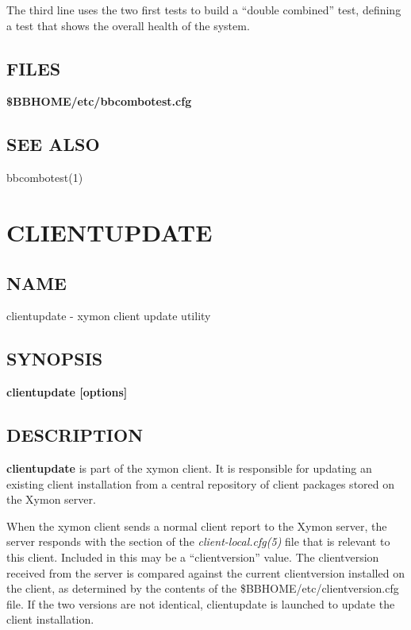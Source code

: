   The third line uses the two first tests to build a ``double
  combined'' test, defining a test that shows the overall health of
  the system. 

 
\subsection{FILES}
\textbf{\$BBHOME/etc/bbcombotest.cfg}

 
\subsection{SEE ALSO}
bbcombotest(1) 


%
\newpage
\section{CLIENTUPDATE}


\subsection{NAME}
 clientupdate - xymon client update utility \subsection{SYNOPSIS}
\textbf{clientupdate [options]}


 
\subsection{DESCRIPTION}
\textbf{clientupdate}
 is part of the xymon client. It is responsible for updating an existing client installation from a central repository of client packages stored on the Xymon server. 

  When the xymon client sends a normal client report to the Xymon server, the server responds with the section of the \emph{client-local.cfg(5)}
 file that is relevant to this client. Included in this may be a ``clientversion'' value. The clientversion received from the server is compared against the current clientversion installed on the client, as determined by the contents of the \$BBHOME/etc/clientversion.cfg file. If the two versions are not identical, clientupdate is launched to update the client installation. 


